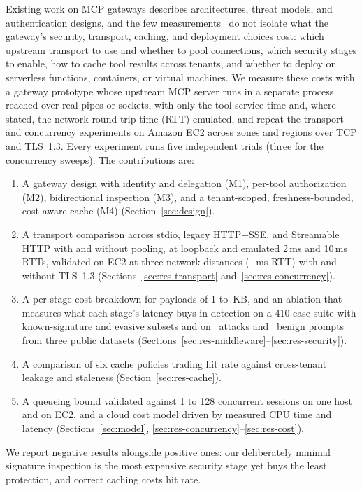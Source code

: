 \documentclass{ieeeaccess}
\newcommand{\ms}{\,ms\xspace}
\begin{document}
Existing work on MCP gateways describes architectures, threat models, and authentication designs, and the few measurements~\cite{ahmadi2025mcpbridge,li2026mcpgateway} do not isolate what the gateway's security, transport, caching, and deployment choices cost: which upstream transport to use and whether to pool connections, which security stages to enable, how to cache tool results across tenants, and whether to deploy on serverless functions, containers, or virtual machines. We measure these costs with a gateway prototype whose upstream MCP server runs in a separate process reached over real pipes or sockets, with only the tool service time and, where stated, the network round-trip time (RTT) emulated, and repeat the transport and concurrency experiments on Amazon EC2 across zones and regions over TCP and TLS~1.3. Every experiment runs five independent trials (three for the concurrency sweeps). The contributions are:
\begin{enumerate}
\item A gateway design with identity and delegation (M1), per-tool authorization (M2), bidirectional inspection (M3), and a tenant-scoped, freshness-bounded, cost-aware cache (M4) (Section~\ref{sec:design}).
\item A transport comparison across stdio, legacy HTTP+\allowbreak SSE, and Streamable HTTP with and without pooling, at loopback and emulated 2\ms and 10\ms RTTs, validated on EC2 at three network distances (\awRttSame--\awRttXreg\ms RTT) with and without TLS~1.3 (Sections~\ref{sec:res-transport} and~\ref{sec:res-concurrency}).
\item A per-stage cost breakdown for payloads of 1 to \mBigSize\,KB, and an ablation that measures what each stage's latency buys in detection on a 410-case suite with known-signature and evasive subsets and on \extAttacks\ attacks and \extBenign\ benign prompts from three public datasets (Sections~\ref{sec:res-middleware}--\ref{sec:res-security}).
\item A comparison of six cache policies trading hit rate against cross-tenant leakage and staleness (Section~\ref{sec:res-cache}).
\item A queueing bound validated against 1 to 128 concurrent sessions on one host and on EC2, and a cloud cost model driven by measured CPU time and latency (Sections~\ref{sec:model}, \ref{sec:res-concurrency}--\ref{sec:res-cost}).
\end{enumerate}

We report negative results alongside positive ones: our deliberately minimal signature inspection is the most expensive security stage yet buys the least protection, and correct caching costs hit rate.
\end{document}

